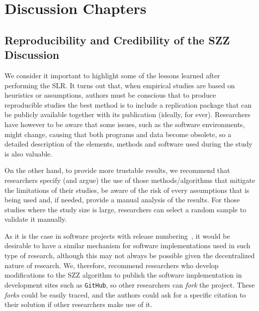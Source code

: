 \documentclass[a4paper, 12pt]{book}
\begin{document}
\section{Discussion Chapters}


\subsection{Reproducibility and Credibility of the SZZ Discussion}
\label{subsec:implicationsSZZ}

We consider it important to highlight some of the lessons learned after performing the SLR. It turns out that, when empirical studies are based on heuristics or assumptions, authors must be conscious that to produce reproducible studies the best method is to include a replication package that can be publicly available together with its publication (ideally, for ever). Researchers have however to be aware that some issues, such as the software environments, might change, causing that both programs and data become obsolete, so a detailed description of the elements, methods and software used during the study is also valuable.

On the other hand, to provide more trustable results, we recommend that researchers specify (and argue) the use of those methods/algorithms that mitigate the limitations of their studies, be aware of the risk of every assumptions that is being used and, if needed, provide a manual analysis of the results. For those studies where the study size is large, researchers can select a random sample to validate it manually.

As it is the case in software projects with release numbering~\cite{israeli2010linux}, it would be desirable to have a similar mechanism for software implementations used in such type of research, although this may not always be possible given the decentralized nature of research. We, therefore, recommend researchers who develop modifications to the SZZ algorithm to publish the software implementation in development sites such as \texttt{GitHub}, so other researchers can \emph{fork} the project. These \emph{forks} could be easily traced, and the authors could ask for a specific citation to their solution if other researchers make use of it.
\end{document}
